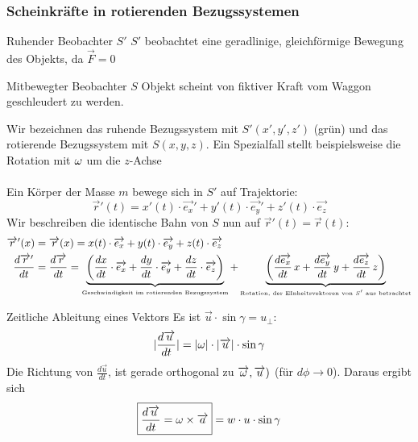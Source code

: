 \documentclass[a4paper,10pt]{scrartcl}
\begin{document}
\begin{enumerate}[a)]
\subsubsection{Scheinkräfte in rotierenden Bezugssystemen}
\begin{ex*}
\begin{seg}{Ruhender Beobachter $S'$}
 $S'$ beobachtet eine geradlinige, gleichförmige Bewegung des Objekts, da $\vec F=0$
\end{seg}
 \begin{seg}{Mitbewegter Beobachter $S$}
  Objekt scheint von fiktiver Kraft vom Waggon geschleudert zu werden. 
 \end{seg}
\end{ex*}
Wir bezeichnen das ruhende Bezugssystem mit $S'(x',y',z')$ (grün) und das rotierende Bezugssystem mit $S(x,y,z)$.
Ein Spezialfall stellt beispielsweise die Rotation mit $\w$ um die $z$-Achse 
\\ \\
Ein Körper der Masse $m$ bewege sich in $S'$ auf Trajektorie:
\[
 \vec r'(t)=x'(t)\cdot \vec{e_x}'+y'(t)\cdot \vec{e_y}'+z'(t)\cdot \vec{e_z}
\]
Wir beschreiben die identische Bahn von $S$ nun auf $\vec r'(t)=\vec r(t)$:
\begin{align*}
 \vec r'(x)&=\vec r(x)=x(t)\cdot \vec{e_x}+y(t)\cdot \vec{e_y}+z(t)\cdot \vec{e_z}\\
\frac{d\vec r'}{dt}&=\frac{d\vec r}{dt}=\underbrace{\left ( \frac{dx}{dt}\cdot \vec{e_x}+\frac{dy}{dt}\cdot \vec{e_y}+\frac{dz}{dt}\cdot \vec{e_z}\right )}_{
\text{\tiny{Geschwindigkeit im rotierenden Bezugssystem}}}+\underbrace{\left (\frac{d\vec{e_x}}{dt}\, x+\frac{d\vec{e_y}}{dt}\,y+\frac{d\vec{e_z}}{dt}\,z \right )}_{\text{\tiny{Rotation, der EInheitsvektoren von $S'$ aus betrachtet}}}
\end{align*}
\begin{seg}{Zeitliche Ableitung eines Vektors}
Es ist $\vec u \cdot \sin\gamma=u_\perp$:
\[
 |\frac{d\vec{u}}{dt}|=|\w|\cdot |\vec u|\cdot \sin \gamma
\]
Die Richtung von $\frac{d\vec{u}}{dt}$, ist gerade orthogonal zu $\vec{\w}, \vec u )$ (für $d\phi\rightarrow 0$).
Daraus ergibt sich 
\[
 \boxed{\frac{d\vec{u}}{dt}=\w\times \va}=w\cdot u \cdot \sin \gamma
\]
\end{seg}
\end{enumerate}
\end{document}
